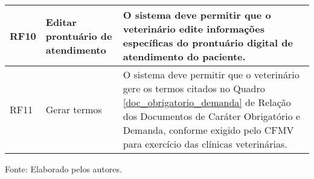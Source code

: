 \documentclass[
    12pt,               %
    openright,          %
    oneside,
    a4paper,            %
    BIBLATEX,           %
    TODO,               %
    english,            %
    brazil              %
    ]{ifsp-spo-inf-ctds}
\begin{document}
\begin{center}
\begin{quadro}[H]
\begin{tabulary}{1.0\textwidth}{|p{5em}|p{8em}|p{18em}|}
                \hline
                RF10 & Editar prontuário de atendimento & O sistema deve permitir que o veterinário edite informações específicas do prontuário digital de atendimento do paciente.\\
                \hline
                RF11 & Gerar termos & O sistema deve permitir que o veterinário gere os termos citados no Quadro \ref{doc_obrigatorio_demanda} de Relação dos Documentos de Caráter Obrigatório e Demanda, conforme exigido pelo CFMV para exercício das clínicas veterinárias.\\
                \hline
                
                \end{tabulary}
                \label{tab:req_func}
                \centering
                
                \footnotesize {Fonte: Elaborado pelos autores.}
                \end{quadro}
            \end{center}   
\end{document}

